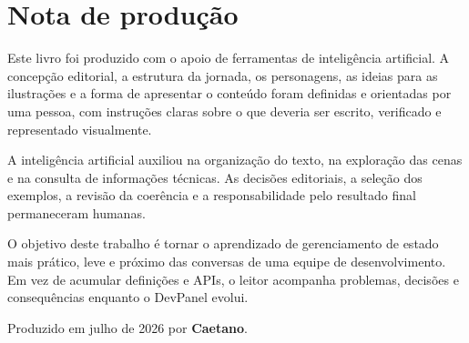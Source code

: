 \chapter*{Nota de produção}

Este livro foi produzido com o apoio de ferramentas de inteligência artificial.
A concepção editorial, a estrutura da jornada, os personagens, as ideias para as
ilustrações e a forma de apresentar o conteúdo foram definidas e orientadas por
uma pessoa, com instruções claras sobre o que deveria ser escrito, verificado e
representado visualmente.

A inteligência artificial auxiliou na organização do texto, na exploração das
cenas e na consulta de informações técnicas. As decisões editoriais, a seleção
dos exemplos, a revisão da coerência e a responsabilidade pelo resultado final
permaneceram humanas.

O objetivo deste trabalho é tornar o aprendizado de gerenciamento de estado mais
prático, leve e próximo das conversas de uma equipe de desenvolvimento. Em vez
de acumular definições e APIs, o leitor acompanha problemas, decisões e
consequências enquanto o DevPanel evolui.

Produzido em julho de 2026 por \textbf{Caetano}.
